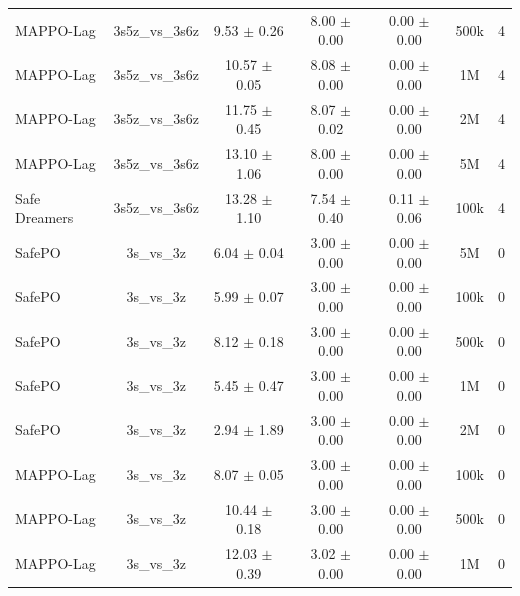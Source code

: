 \begin{longtable}{lcccccc}
MAPPO-Lag & 3s5z\_vs\_3s6z & \textcolor{green!60!black}{9.53 $\pm$ 0.26} & \textcolor{green!60!black}{8.00 $\pm$ 0.00} & \textcolor{green!60!black}{0.00 $\pm$ 0.00} & 500k & 4 \\
MAPPO-Lag & 3s5z\_vs\_3s6z & \textcolor{green!60!black}{10.57 $\pm$ 0.05} & \textcolor{green!60!black}{8.08 $\pm$ 0.00} & \textcolor{green!60!black}{0.00 $\pm$ 0.00} & 1M & 4 \\
MAPPO-Lag & 3s5z\_vs\_3s6z & \textcolor{green!60!black}{11.75 $\pm$ 0.45} & \textcolor{green!60!black}{8.07 $\pm$ 0.02} & \textcolor{green!60!black}{0.00 $\pm$ 0.00} & 2M & 4 \\
MAPPO-Lag & 3s5z\_vs\_3s6z & \textcolor{green!60!black}{13.10 $\pm$ 1.06} & \textcolor{green!60!black}{8.00 $\pm$ 0.00} & \textcolor{green!60!black}{0.00 $\pm$ 0.00} & 5M & 4 \\
Safe Dreamers & 3s5z\_vs\_3s6z & 13.28 $\pm$ 1.10 & 7.54 $\pm$ 0.40 & 0.11 $\pm$ 0.06 & 100k & 4 \\
\midrule
SafePO & 3s\_vs\_3z & \textcolor{green!60!black}{6.04 $\pm$ 0.04} & \textcolor{green!60!black}{3.00 $\pm$ 0.00} & \textcolor{green!60!black}{0.00 $\pm$ 0.00} & 5M & 0 \\
SafePO & 3s\_vs\_3z & \textcolor{green!60!black}{5.99 $\pm$ 0.07} & \textcolor{green!60!black}{3.00 $\pm$ 0.00} & \textcolor{green!60!black}{0.00 $\pm$ 0.00} & 100k & 0 \\
SafePO & 3s\_vs\_3z & \textcolor{green!60!black}{8.12 $\pm$ 0.18} & \textcolor{green!60!black}{3.00 $\pm$ 0.00} & \textcolor{green!60!black}{0.00 $\pm$ 0.00} & 500k & 0 \\
SafePO & 3s\_vs\_3z & \textcolor{green!60!black}{5.45 $\pm$ 0.47} & \textcolor{green!60!black}{3.00 $\pm$ 0.00} & \textcolor{green!60!black}{0.00 $\pm$ 0.00} & 1M & 0 \\
SafePO & 3s\_vs\_3z & \textcolor{green!60!black}{2.94 $\pm$ 1.89} & \textcolor{green!60!black}{3.00 $\pm$ 0.00} & \textcolor{green!60!black}{0.00 $\pm$ 0.00} & 2M & 0 \\
MAPPO-Lag & 3s\_vs\_3z & \textcolor{green!60!black}{8.07 $\pm$ 0.05} & \textcolor{green!60!black}{3.00 $\pm$ 0.00} & \textcolor{green!60!black}{0.00 $\pm$ 0.00} & 100k & 0 \\
MAPPO-Lag & 3s\_vs\_3z & \textcolor{green!60!black}{10.44 $\pm$ 0.18} & \textcolor{green!60!black}{3.00 $\pm$ 0.00} & \textcolor{green!60!black}{0.00 $\pm$ 0.00} & 500k & 0 \\
MAPPO-Lag & 3s\_vs\_3z & \textcolor{green!60!black}{12.03 $\pm$ 0.39} & \textcolor{green!60!black}{3.02 $\pm$ 0.00} & \textcolor{green!60!black}{0.00 $\pm$ 0.00} & 1M & 0 \\

\end{longtable}
